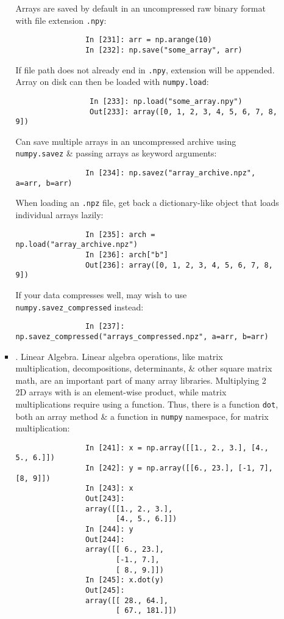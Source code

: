 \documentclass{article}
\begin{document}
\begin{enumerate}
\begin{itemize}
\begin{itemize}
			 Arrays are saved by default in an uncompressed raw binary format with file extension {\tt.npy}:
			\begin{verbatim}
				In [231]: arr = np.arange(10)
				In [232]: np.save("some_array", arr)
			\end{verbatim}
			If file path does not already end in {\tt.npy}, extension will be appended. Array on disk can then be loaded with {\tt numpy.load}:
			\begin{verbatim}
				 In [233]: np.load("some_array.npy")
				 Out[233]: array([0, 1, 2, 3, 4, 5, 6, 7, 8, 9])
			\end{verbatim}
			Can save multiple arrays in an uncompressed archive using {\tt numpy.savez} \& passing arrays as keyword arguments:
			\begin{verbatim}
				In [234]: np.savez("array_archive.npz", a=arr, b=arr)
			\end{verbatim}
			When loading an {\tt.npz} file, get back a dictionary-like object that loads individual arrays lazily:
			\begin{verbatim}
				In [235]: arch = np.load("array_archive.npz")
				In [236]: arch["b"]
				Out[236]: array([0, 1, 2, 3, 4, 5, 6, 7, 8, 9])
			\end{verbatim}
			If your data compresses well, may wish to use \verb|numpy.savez_compressed| instead:
			\begin{verbatim}
				In [237]: np.savez_compressed("arrays_compressed.npz", a=arr, b=arr)
			\end{verbatim}
			\item {. Linear Algebra.} Linear algebra operations, like matrix multiplication, decompositions, determinants, \& other square matrix math, are an important part of many array libraries. Multiplying 2 2D arrays with {\tt*} is an element-wise product, while matrix multiplications require using a function. Thus, there is a function {\tt dot}, both an array method \& a function in {\tt numpy} namespace, for matrix multiplication:
			\begin{verbatim}
				In [241]: x = np.array([[1., 2., 3.], [4., 5., 6.]])
				In [242]: y = np.array([[6., 23.], [-1, 7], [8, 9]])
				In [243]: x
				Out[243]:
				array([[1., 2., 3.],
				       [4., 5., 6.]])
				In [244]: y
				Out[244]:
				array([[ 6., 23.],
				       [-1., 7.],
				       [ 8., 9.]])
				In [245]: x.dot(y)
				Out[245]:
				array([[ 28., 64.],
				       [ 67., 181.]])
			\end{verbatim}

\end{itemize}
\end{itemize}
\end{enumerate}
\end{document}
